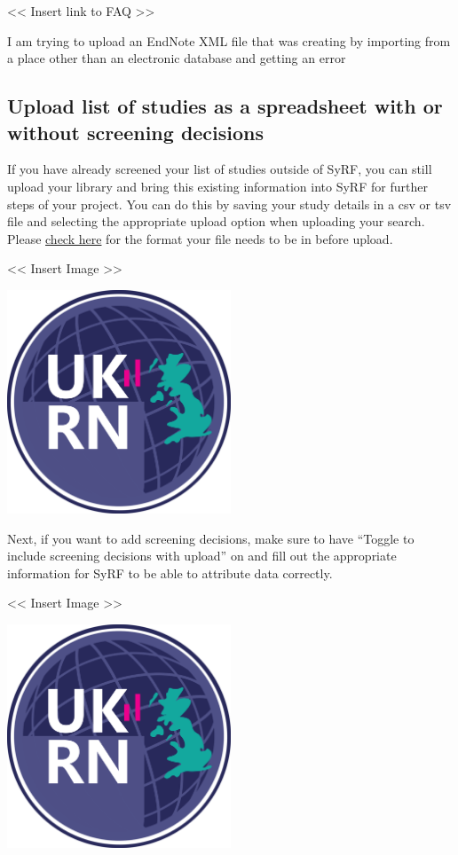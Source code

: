 \documentclass[
]{book}
\begin{document}
\textless{}\textless{} Insert link to FAQ \textgreater{}\textgreater{}

I am trying to upload an EndNote XML file that was creating by importing from a place other than an electronic database and getting an error

\hypertarget{upload-list-of-studies-as-a-spreadsheet-with-or-without-screening-decisions}{%
\subsection{Upload list of studies as a spreadsheet with or without screening decisions}\label{upload-list-of-studies-as-a-spreadsheet-with-or-without-screening-decisions}}

If you have already screened your list of studies outside of SyRF, you can still upload your library and bring this existing information into SyRF for further steps of your project. You can do this by saving your study details in a csv or tsv file and selecting the appropriate upload option when uploading your search. Please \href{https://app.syrf.org.uk/assets/pdfs/Systematic\%20search\%20instructions.pdf}{check here} for the format your file needs to be in before upload.

\textless{}\textless{} Insert Image \textgreater{}\textgreater{}

\includegraphics[width=0.5\textwidth,height=0.5\textheight]{figs/evidence-triangle.png}

Next, if you want to add screening decisions, make sure to have ``Toggle to include screening decisions with upload'' on and fill out the appropriate information for SyRF to be able to attribute data correctly.

\textless{}\textless{} Insert Image \textgreater{}\textgreater{}

\includegraphics[width=0.5\textwidth,height=0.5\textheight]{figs/evidence-triangle.png}
\end{document}
